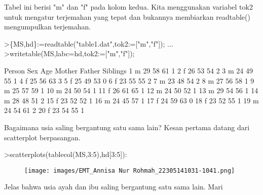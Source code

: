\documentclass[a4paper,10pt]{article}
\begin{document}
\begin{eulernotebook}
\begin{eulercomment}
\begin{eulercomment}
\begin{eulercomment}
\begin{eulercomment}
\begin{eulercomment}
Tabel ini berisi "m" dan "f" pada kolom kedua. Kita menggunakan
variabel tok2 untuk mengatur terjemahan yang tepat dan bukannya
membiarkan readtable() mengumpulkan terjemahan.
\end{eulercomment}
\begin{eulerprompt}
>\{MS,hd\}:=readtable("table1.dat",tok2:=["m","f"]);  ...
>writetable(MS,labc=hd,tok2:=["m","f"]);
\end{eulerprompt}
\begin{euleroutput}
      Person       Sex       Age    Mother    Father  Siblings
           1         m        29        58        61         1
           2         f        26        53        54         2
           3         m        24        49        55         1
           4         f        25        56        63         3
           5         f        25        49        53         0
           6         f        23        55        55         2
           7         m        23        48        54         2
           8         m        27        56        58         1
           9         m        25        57        59         1
          10         m        24        50        54         1
          11         f        26        61        65         1
          12         m        24        50        52         1
          13         m        29        54        56         1
          14         m        28        48        51         2
          15         f        23        52        52         1
          16         m        24        45        57         1
          17         f        24        59        63         0
          18         f        23        52        55         1
          19         m        24        54        61         2
          20         f        23        54        55         1
\end{euleroutput}
\begin{eulercomment}
Bagaimana usia saling bergantung satu sama lain? Kesan pertama datang
dari scatterplot berpasangan.
\end{eulercomment}
\begin{eulerprompt}
>scatterplots(tablecol(MS,3:5),hd[3:5]):
\end{eulerprompt}
\begin{figure}[h]
    \centering
    \texttt{[image: images/EMT\_Annisa Nur Rohmah\_22305141031-1041.png]}
\end{figure}
\begin{eulercomment}
Jelas bahwa usia ayah dan ibu saling bergantung satu sama lain. Mari

\end{eulercomment}
\end{eulercomment}
\end{eulercomment}
\end{eulercomment}
\end{eulercomment}
\end{eulernotebook}
\end{document}

